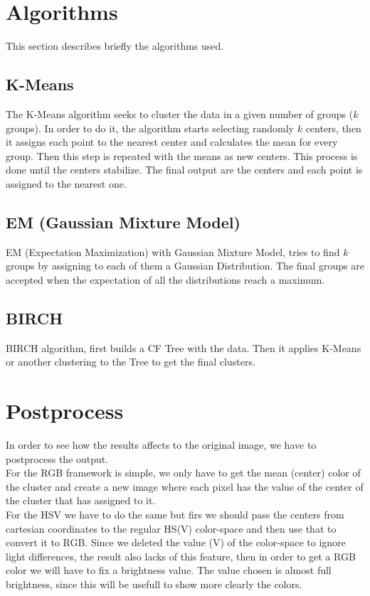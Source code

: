 \documentclass[sigconf,authorversion]{acmart}
\begin{document}
\section{Algorithms}
This section describes briefly the algorithms used.
\subsection{K-Means}
The K-Means algorithm seeks to cluster the data in a given number of groups ($k$ groups). In order to do it, the algorithm starts selecting randomly $k$ centers, then it assigns each point to the nearest center and calculates the mean for every group. Then this step is repeated with the means as new centers. This process is done until the centers stabilize. The final output are the centers and each point is assigned to the nearest one.
\subsection{EM (Gaussian Mixture Model)}
EM (Expectation Maximization) with Gaussian Mixture Model, tries to find $k$ groups by assigning to each of them a Gaussian Distribution. The final groups are accepted when the expectation of all the distributions reach a maximum.
\subsection{BIRCH}
BIRCH algorithm, first builds a CF Tree with the data. Then it applies K-Means or another clustering to the Tree to get the final clusters.

\section{Postprocess}
In order to see how the results affects to the original image, we have to postprocess the output.\\
For the RGB framework is simple, we only have to get the mean (center) color of the cluster and create a new image where each pixel has the value of the center of the cluster that has assigned to it.\\
For the HSV we have to do the same but firs we should pass the centers from cartesian coordinates to the regular HS(V) color-space and then use that to convert it to RGB. Since we deleted the value (V) of the color-space to ignore light differences, the result also lacks of this feature, then in order to get a RGB color we will have to fix a brightness value. The value chosen is almost full brightness, since this will be usefull to show more clearly the colors.
\end{document}
